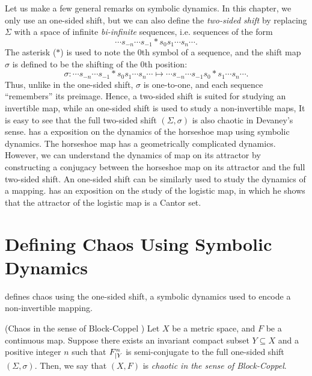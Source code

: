 \documentclass[10pt,twoside]{book}
\begin{document}
Let us make a few general remarks on symbolic dynamics.
In this chapter, we only use an one-sided shift, but we can also define the \textit{two-sided shift} by replacing $\Sigma$ with a space of infinite \textit{bi-infinite} sequences, i.e. sequences of the form 
\begin{equation*}
  \cdots s_{-n} \cdots s_{-1} * s_0 s_1 \cdots s_n \cdots.
\end{equation*}
The asterisk ($*$) is used to note the 0th symbol of a sequence, and the shift map $\sigma$ is defined to be the shifting of the 0th position:
\begin{equation*}
  \sigma: \cdots s_{-n} \cdots s_{-1} * s_0 s_1 \cdots s_n \cdots
  \mapsto
  \cdots s_{-n} \cdots s_{-1} s_0 * s_1 \cdots s_n \cdots.
\end{equation*}
Thus, unlike in the one-sided shift, $\sigma$ is one-to-one, and each sequence ``remembers'' its preimage.
Hence, a two-sided shift is suited for studying an invertible map, while an one-sided shift is used to study a non-invertible maps,
It is easy to see that the full two-sided shift $(\Sigma, \sigma)$ is also chaotic in Devaney's sense.
\citet{wiggins} has a exposition on the dynamics of the horseshoe map using symbolic dynamics.
The horseshoe map has a geometrically complicated dynamics.
However, we can understand the dynamics of map on its attractor by constructing a conjugacy between the horseshoe map on its attractor and the full two-sided shift.
An one-sided shift can be similarly used to study the dynamics of a mapping.
\citet{sternberg} has an exposition on the study of the logistic map, in which he shows that the attractor of the logistic map is a Cantor set.


\section{Defining Chaos Using Symbolic Dynamics}
\citet{blockcoppel} defines chaos using the one-sided shift, a symbolic dynamics used to encode a non-invertible mapping.
\begin{definition}
  (Chaos in the sense of Block-Coppel \citep{blockcoppel})
  Let $X$ be a metric space, and $F$ be a continuous map.
  Suppose there exists an invariant compact subset $Y \subseteq X$ and a positive integer $n$ such that $F^{n}_{|Y}$ is semi-conjugate to the full one-sided shift $(\Sigma, \sigma)$.
  Then, we say that $(X,F)$ is \textit{chaotic in the sense of Block-Coppel}.
  \begin{center}
  \end{center}
  \label{defn:blockcoppel}
\end{definition}





\printindex
\end{document}
